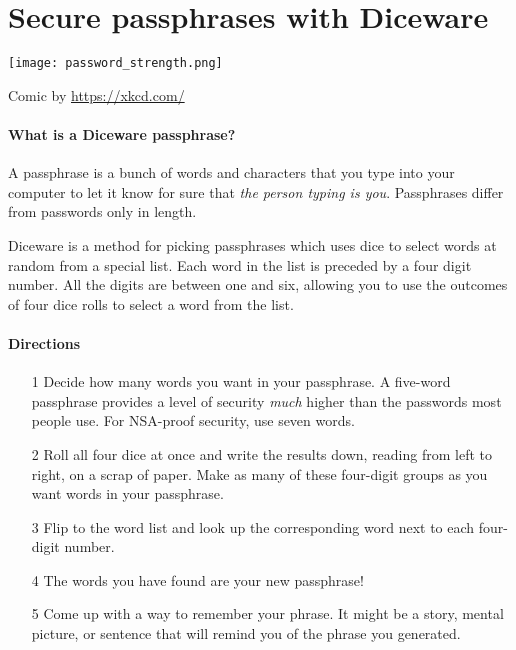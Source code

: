 \chapter*{Secure passphrases with Diceware}
\label{ch:diceware}

\vspace{-.2in}
\texttt{[image: password\_strength.png]}

\vspace{-.125in}
\begin{tiny}
	\begin{center}
		Comic by \url{https://xkcd.com/} \ccbync 
	\end{center}
\end{tiny}

\newpage
\setlength{\parindent}{0em}
\setlength{\parskip}{0.5em}

\subsubsection*{What is a Diceware passphrase?}

A passphrase is a bunch of words and characters that you type into your computer to let it know for sure that \textit{the person typing is you}. Passphrases differ from passwords only in length.

Diceware is a method for picking passphrases which uses dice to select words at random from a special list. Each word in the list is preceded by a four digit number. All the digits are between one and six, allowing you to use the outcomes of four dice rolls to select a word from the list.

\subsubsection*{Directions}

\begin{itemize}[leftmargin=*]

\item[1] Decide how many words you want in your passphrase. A five-word passphrase provides a level of security \textit{much} higher than the passwords most people use. For NSA-proof security, use seven words.

\item[2] Roll all four dice at once and write the results down, reading from left to right, on a scrap of paper. Make as many of these four-digit groups as you want words in your passphrase.

\item[3] Flip to the word list and look up the corresponding word next to each four-digit number.

\item[4] The words you have found are your new passphrase!

\item[5] Come up with a way to remember your phrase. It might be a story, mental picture, or sentence that will remind you of the phrase you generated.

\end{itemize}


